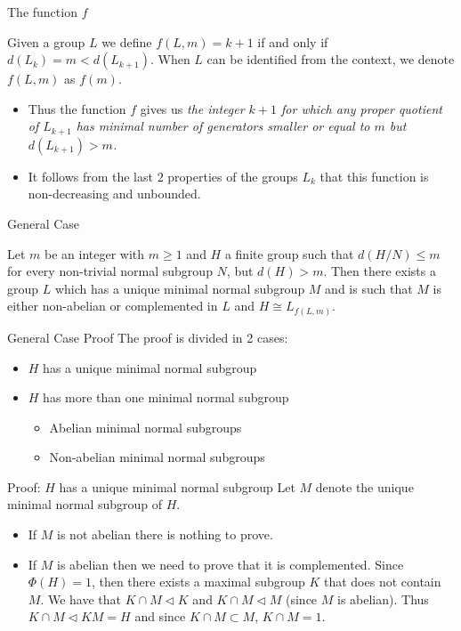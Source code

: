 \documentclass{beamer}
\newcommand{\nsub}{\triangleleft}
\begin{document}
\begin{frame}{The function $f$}
    \begin{definition}
        Given a group $L$ we define $f(L, m) = k+1$ if and only if $d(L_k) = m < d(L_{k+1})$. When $L$ can be identified from the context, we denote $f(L,m)$ as $f(m)$.
    \end{definition}
    \begin{itemize}
        \item<2-> Thus the function $f$ gives us \textit{the integer $k+1$ for which any proper quotient of $L_{k+1}$ has minimal number of generators smaller or equal to $m$ but $d(L_{k+1}) > m$.}
        \item<3-> It follows from the last $2$ properties of the groups $L_k$ that this function is non-decreasing and unbounded. 
    \end{itemize}
\end{frame}

\begin{frame}{General Case}
    \begin{theorem}
        Let $m$ be an integer with $m \ge 1$ and $H$ a finite group such that $d(H/N) \le m$ for every non-trivial normal subgroup $N$, but $d(H) > m$. Then there exists a group $L$ which has a unique minimal normal subgroup $M$ and is such that $M$ is either non-abelian or complemented in $L$ and $H \cong L_{f(L,m)}$.
    \end{theorem}    

\end{frame}

\begin{frame}{General Case Proof}
    The proof is divided in 2 cases:
    \begin{itemize}
        \item<2-> $H$ has a unique minimal normal subgroup
        \item<3-> $H$ has more than one minimal normal subgroup
        \begin{itemize}
            \item<4-> Abelian minimal normal subgroups
            \item<5-> Non-abelian minimal normal subgroups
        \end{itemize}
    \end{itemize}
\end{frame}

\begin{frame}{Proof: $H$ has a unique minimal normal subgroup}
    Let $M$ denote the unique minimal normal subgroup of $H$. 
    \begin{itemize}
        \item<2-> If $M$ is not abelian there is nothing to prove.
        \item<3-> If $M$ is abelian then we need to prove that it is complemented. 
        Since $\Phi(H) = 1$, then there exists a maximal subgroup $K$ that does not contain $M$. We have that $K \cap M \nsub K$ and $K \cap M \nsub M$ (since $M$ is abelian). Thus $K \cap M \nsub KM = H$ and since $K \cap M \subset M$, $K \cap M = 1$. 
    \end{itemize}
\end{frame}
\end{document}
